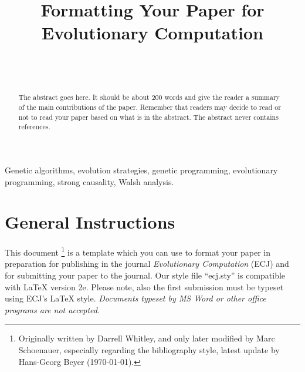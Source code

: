 \documentclass[twoside]{article}
\begin{document}
\title{\bf Formatting Your Paper for Evolutionary Computation}  

\author{ \hfill {}\\ 
\AND
        \hfill {}\\
}

\maketitle

\begin{abstract}

The abstract goes here.  It should be about 200 words and give the
reader a summary of the main contributions of the paper.   
Remember that readers may decide to read or not to read your
paper based on what is in the abstract.  The abstract never
contains references.  

\end{abstract}

\begin{keywords}

Genetic algorithms, 
evolution strategies,
genetic programming,
evolutionary programming,
strong causality,
Walsh analysis.

\end{keywords}

\section{General Instructions}

This document%
\footnote{Originally written by Darrell Whitley, and only later
  modified by Marc Schoenauer, especially regarding the bibliography style,
  latest update by Hans-Georg Beyer (\today).} 
is a template which you can use to format your paper in 
preparation for publishing in the journal {\em Evolutionary Computation} 
(ECJ) and for submitting your paper to the journal. Our style file 
``ecj.sty'' is compatible with \LaTeX{} version 2e. Please note, also the 
first submission must be typeset using ECJ's \LaTeX{} style. {\em Documents 
typeset by MS Word or other office programs are not accepted.}   
\end{document}
